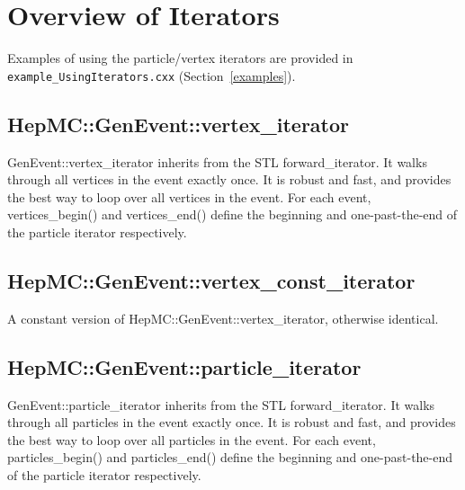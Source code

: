 \documentclass[11pt,letterpaper]{article}
\begin{document}
%
%

\section{Overview of Iterators}
\label{iterators}

Examples of using the particle/vertex iterators are provided in
\verb!example_UsingIterators.cxx! (Section~\ref{examples}).

%
%

\subsection{HepMC::GenEvent::vertex\_iterator}

GenEvent::vertex\_iterator inherits from the STL forward\_iterator. It
walks through all vertices in the event exactly once. It is robust and
fast, and provides the best way to loop over all vertices in the
event. For each event,
vertices\_begin() and vertices\_end() define the beginning and
one-past-the-end of the particle iterator respectively.


%
%

\subsection{HepMC::GenEvent::vertex\_const\_iterator}

A constant version of HepMC::GenEvent::vertex\_iterator, otherwise identical.

%
%

\subsection{HepMC::GenEvent::particle\_iterator}

GenEvent::particle\_iterator inherits from the STL
forward\_iterator. It walks through all particles in the
event exactly once. It is robust and fast, and provides the best way
to loop over all particles in the event. For each event,
particles\_begin() and particles\_end() define the beginning and
one-past-the-end of the particle iterator respectively.


%
%
\end{document}
